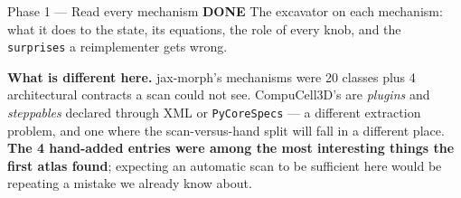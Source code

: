 \documentclass[11pt,a4paper]{article}
\newcommand{\code}[1]{\texttt{#1}}
\newcommand{\done}{\textcolor{good}{\textbf{DONE}}}
\begin{document}
\begin{phasebox}{Phase 1 --- Read every mechanism \hfill \done}
The excavator on each mechanism: what it does to the state, its equations, the role of every knob,
and the \code{surprises} a reimplementer gets wrong.

\textbf{What is different here.} jax-morph's mechanisms were 20 classes plus 4 architectural
contracts a scan could not see. CompuCell3D's are \emph{plugins} and \emph{steppables} declared
through XML or \code{PyCoreSpecs} --- a different extraction problem, and one where the
scan-versus-hand split will fall in a different place. \textbf{The 4 hand-added entries were among
the most interesting things the first atlas found}; expecting an automatic scan to be sufficient
here would be repeating a mistake we already know about.
\end{phasebox}
\end{document}
